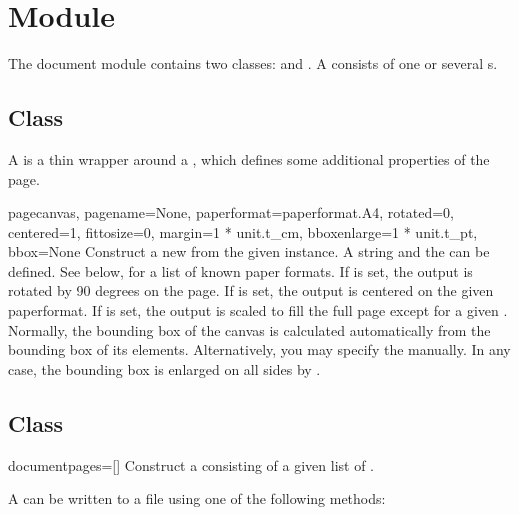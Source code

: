 \section{Module }
\label{document}





The document module contains two classes:  and
. A  consists of one or several
s.


\subsection{Class }

A  is a thin wrapper around a , which
defines some additional properties of the page.

\begin{classdesc}{page}{canvas, pagename=None,
    paperformat=paperformat.A4, rotated=0, centered=1, fittosize=0,
    margin=1 * unit.t_cm, bboxenlarge=1 * unit.t_pt, bbox=None}
  Construct a new  from the given  instance.
  A string  and the  can be
  defined. See below, for a list of known paper formats.
  If  is set, the output is rotated by 90 degrees on the
  page. If  is set, the output is centered on the given
  paperformat. If  is set, the output is scaled to fill
  the full page except for a given . 
  Normally, the bounding box of the canvas is calculated automatically
  from the bounding box of its elements.  Alternatively, you may
  specify the  manually. In any case, the bounding box is
  enlarged on all sides by .
\end{classdesc}

\subsection{Class }

\begin{classdesc}{document}{pages=[]}
    Construct a  consisting of a given list of .
\end{classdesc}

A  can be written to a file using one of the following methods:

